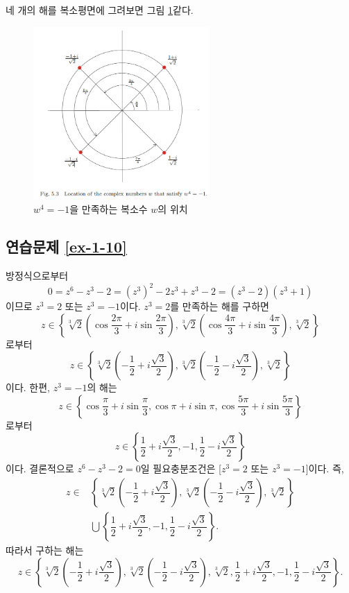 네 개의 해를 복소평면에 그려보면 그림 \ref{fig-5-3}\과 같다.

\begin{figure}[h!]
\begin{center}
\includegraphics[width=0.6\textwidth]{./figs/fig-5-3}
\end{center}
\caption{$w^4=-1$을 만족하는 복소수 $w$의 위치}
\label{fig-5-3}
\end{figure}

\subsection*{연습문제 \ref{ex-1-10}}

방정식으로부터
\[
0=z^6 -z^3-2 = (z^3)^2 -2z^3 +z^3 -2 = (z^3-2)(z^3+1)
\]
이므로
$z^3=2$ 또는 $z^3=-1$이다.
$z^3=2$를 만족하는 해를 구하면
\[
z\in \left\{ \sqrt[3]{2} \left( \cos\dfrac{2\pi}3 + i\sin\dfrac{2\pi}3\right),
\sqrt[3]{2} \left( \cos\dfrac{4\pi}3 + i\sin\dfrac{4\pi}3\right), 
\sqrt[3]{2} \right\}
\]
로부터 
\[
z\in \left\{ \sqrt[3]{2} \left( - \dfrac12+ i\dfrac{\sqrt{3}}2\right),
\sqrt[3]{2} \left( -\dfrac12 - i\dfrac{\sqrt{3}}2\right), 
\sqrt[3]{2} \right\}
\]
이다. 한편, $z^3=-1$의 해는
\[
z\in\left\{ \cos\dfrac\pi3 + i\sin\dfrac\pi3, \cos\pi + i\sin\pi,
\cos\dfrac{5\pi}3 + i\sin\dfrac{5\pi}3 \right\}
\]
로부터 
\[
z\in \left\{ \dfrac12+ i\dfrac{\sqrt{3}}2, -1,
\dfrac12 - i\dfrac{\sqrt{3}}2 \right\}
\]
이다. 결론적으로
$z^6 - z^3-2=0$일 필요충분조건은 [$z^3=2$ 또는 $z^3=-1$]이다.
즉,
\begin{align*}
z\in & \left\{ \sqrt[3]{2} \left( - \dfrac12+ i\dfrac{\sqrt{3}}2\right),
\sqrt[3]{2} \left( -\dfrac12 - i\dfrac{\sqrt{3}}2\right), 
\sqrt[3]{2} \right\}\\
&\bigcup \left\{ \dfrac12+ i\dfrac{\sqrt{3}}2, -1,
\dfrac12 - i\dfrac{\sqrt{3}}2 \right\}.
\end{align*}
따라서 구하는 해는
\[
z\in \left\{ \sqrt[3]{2} \left( - \dfrac12+ i\dfrac{\sqrt{3}}2\right),
\sqrt[3]{2} \left( -\dfrac12 - i\dfrac{\sqrt{3}}2\right), 
\sqrt[3]{2},
\dfrac12+ i\dfrac{\sqrt{3}}2, -1,
\dfrac12 - i\dfrac{\sqrt{3}}2 \right\}.
\]

